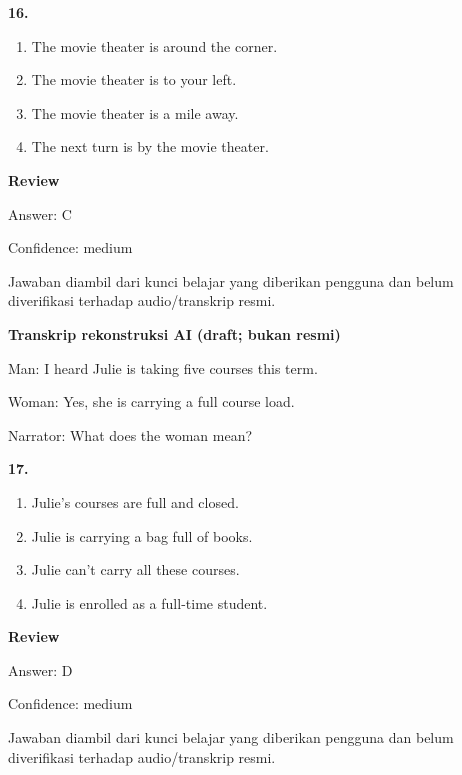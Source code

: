 \documentclass[12pt]{article}
\begin{document}
\noindent\textbf{16.}
\begin{enumerate}[label=(\Alph*),leftmargin=*,itemsep=0.2em]
\item The movie theater is around the corner.
\item The movie theater is to your left.
\item The movie theater is a mile away.
\item The next turn is by the movie theater.
\end{enumerate}
\par
\begingroup
\setlength{\parskip}{0pt}
\setlength{\parindent}{0pt}
\textbf{Review}\par
Answer: C\par
Confidence: medium\par
Jawaban diambil dari kunci belajar yang diberikan pengguna dan belum diverifikasi terhadap audio/transkrip resmi.\par
\endgroup
\par
\vspace{0.25\baselineskip}
\begin{exampleblock}
\textbf{Transkrip rekonstruksi AI (draft; bukan resmi)}\par
Man: I heard Julie is taking five courses this term.\par
Woman: Yes, she is carrying a full course load.\par
Narrator: What does the woman mean?\par
\end{exampleblock}
\noindent\textbf{17.}
\begin{enumerate}[label=(\Alph*),leftmargin=*,itemsep=0.2em]
\item Julie's courses are full and closed.
\item Julie is carrying a bag full of books.
\item Julie can't carry all these courses.
\item Julie is enrolled as a full-time student.
\end{enumerate}
\par
\begingroup
\setlength{\parskip}{0pt}
\setlength{\parindent}{0pt}
\textbf{Review}\par
Answer: D\par
Confidence: medium\par
Jawaban diambil dari kunci belajar yang diberikan pengguna dan belum diverifikasi terhadap audio/transkrip resmi.\par
\endgroup
\par
\vspace{0.25\baselineskip}
\end{document}
